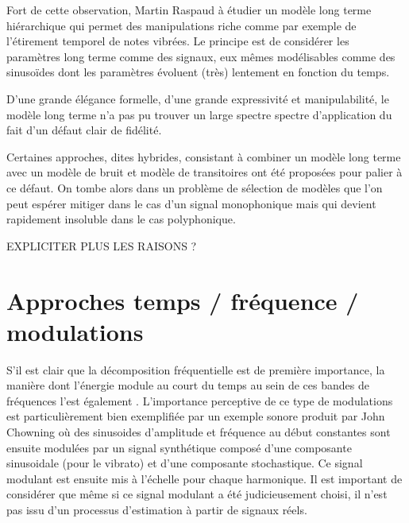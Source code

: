 Fort de cette observation, Martin Raspaud à étudier un modèle long terme hiérarchique qui permet des manipulations riche comme par exemple de l'étirement temporel de notes vibrées. Le principe est de considérer les paramètres long terme comme des signaux, eux mêmes modélisables comme des sinusoïdes dont les paramètres évoluent (très) lentement en fonction du temps.

D'une grande élégance formelle, d'une grande expressivité et manipulabilité, le modèle long terme n'a pas pu trouver un large spectre spectre d'application du fait d'un défaut clair de fidélité.

Certaines approches, dites hybrides, consistant à combiner un modèle long terme avec un modèle de bruit et modèle de transitoires ont été proposées pour palier à ce défaut. On tombe alors dans un problème de sélection de modèles que l'on peut espérer mitiger dans le cas d'un signal monophonique mais qui devient  rapidement insoluble dans le cas polyphonique.

EXPLICITER PLUS LES RAISONS ?

\section{Approches temps / fréquence / modulations}  \label{sec:tfm}

S'il est clair que la décomposition fréquentielle est de première importance, la manière dont l'énergie module au court du temps au sein de ces bandes de fréquences l'est également . L'importance perceptive de ce type de modulations est particulièrement bien exemplifiée par un exemple sonore produit par John Chowning où des sinusoides d'amplitude et fréquence au début constantes sont ensuite modulées par un signal synthétique composé d'une composante sinusoidale (pour le vibrato) et d'une composante stochastique. Ce signal modulant est ensuite mis à l'échelle pour chaque harmonique. Il est important de considérer que même si ce signal modulant a été judicieusement choisi, il n'est pas issu d'un processus d'estimation à partir de signaux réels.

